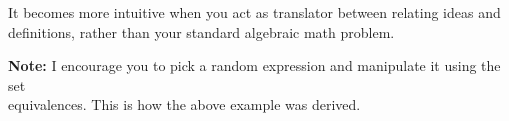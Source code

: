 \noindent
It becomes more intuitive when you act as translator between relating ideas and definitions,
rather than your standard algebraic math problem.\\

\begin{Note}
    \textbf{Note:} I encourage you to pick a random expression and manipulate it using the set\\
    equivalences. This is how the above example was derived.\\
\end{Note}